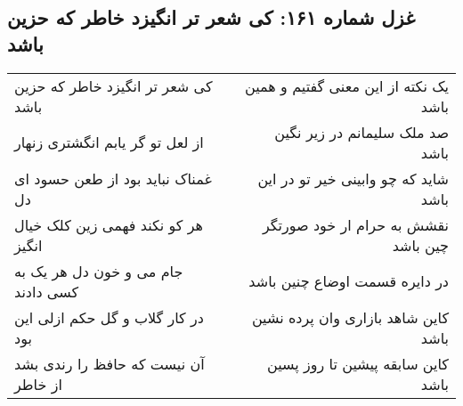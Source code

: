 \begin{center}
\section*{غزل شماره ۱۶۱: کی شعر تر انگیزد خاطر که حزین باشد}
\label{sec:sh161}
\begin{longtable}{l p{0.5cm} r}
کی شعر تر انگیزد خاطر که حزین باشد
&&
یک نکته از این معنی گفتیم و همین باشد
\\
از لعل تو گر یابم انگشتری زنهار
&&
صد ملک سلیمانم در زیر نگین باشد
\\
غمناک نباید بود از طعن حسود ای دل
&&
شاید که چو وابینی خیر تو در این باشد
\\
هر کو نکند فهمی زین کلک خیال انگیز
&&
نقشش به حرام ار خود صورتگر چین باشد
\\
جام می و خون دل هر یک به کسی دادند
&&
در دایره قسمت اوضاع چنین باشد
\\
در کار گلاب و گل حکم ازلی این بود
&&
کاین شاهد بازاری وان پرده نشین باشد
\\
آن نیست که حافظ را رندی بشد از خاطر
&&
کاین سابقه پیشین تا روز پسین باشد
\\
\end{longtable}
\end{center}
